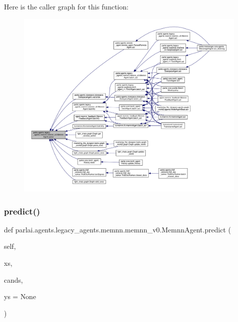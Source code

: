 Here is the caller graph for this function\+:
\nopagebreak
\begin{figure}[H]
\begin{center}
\leavevmode
\includegraphics[width=350pt]{classparlai_1_1agents_1_1legacy__agents_1_1memnn_1_1memnn__v0_1_1MemnnAgent_a5e9b6393cb251b6030bb9a0db51b8026_icgraph}
\end{center}
\end{figure}
\mbox{\label{classparlai_1_1agents_1_1legacy__agents_1_1memnn_1_1memnn__v0_1_1MemnnAgent_a4e850d51ca01adc45754cc509c8b096a}} 
\subsubsection{\texorpdfstring{predict()}{predict()}}
{\footnotesize\ttfamily def parlai.\+agents.\+legacy\+\_\+agents.\+memnn.\+memnn\+\_\+v0.\+Memnn\+Agent.\+predict (\begin{DoxyParamCaption}\item[{}]{self,  }\item[{}]{xs,  }\item[{}]{cands,  }\item[{}]{ys = {\ttfamily None} }\end{DoxyParamCaption})}



